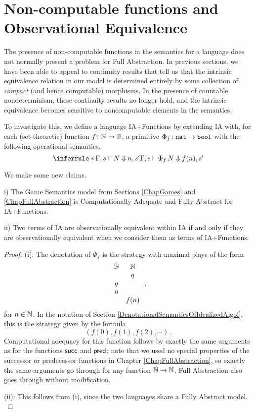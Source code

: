 \section{Non-computable functions and Observational Equivalence}
\label{SecNonComputable}

The presence of non-computable functions in the semantics for a language does not normally present a problem for Full Abstraction.  
In previous sections, we have been able to appeal to continuity results that tell us that the intrinsic equivalence relation in our model is determined entirely by some collection of \emph{compact} (and hence computable) morphisms.  
In the presence of countable nondeterminism, these continuity results no longer hold, and the intrinsic equivalence becomes sensitive to noncomputable elements in the semantics.

To investigate this, we define a language IA+Functions by extending IA with, for each (set-theoretic) function $f\colon \mathbb{N} \to \mathbb{B}$, a primitive $\Phi_f \colon {\mathtt{nat}} \to {\mathtt{bool}}$ with the following operational semantics.
\[
  \inferrule*{\Gamma,s\ts N \converges n,s'}{\Gamma,s \ts \mathop{\Phi_f}N \converges f(n),s'}
  \]

We make some new claims.

\begin{proposition}
  i) The Game Semantics model from Sections \ref{ChapGames} and \ref{ChapFullAbstraction} is Computationally Adequate and Fully Abstract for IA+Functions.

  ii) Two terms of IA are observationally equivalent within IA if and only if they are observationally equivalent when we consider them as terms of IA+Functions.
\end{proposition}
\begin{proof}
  (i): The denotation of $\Phi_f$ is the strategy with maximal plays of the form
  \[
    \begin{array}{cc}
      \mathbb{N} & \mathbb{N} \\
          &  q  \\
       q  &     \\
       n  &     \\
          & f(n)
    \end{array}\,,
    \]
  for $n\in \mathbb{N}$.  
  In the notation of Section \ref{DenotationalSemanticsOfIdealizedAlgol}, this is the strategy given by the formula
  \[
    ( f(0), f(1), f(2), \cdots )\,.
    \]
  Computational adequacy for this function follows by exactly the same arguments as for the functions $\operatorname{{\mathsf{succ}}}$ and $\operatorname{{\mathsf{pred}}}$; note that we used no special properties of the successor or predecessor functions in Chapter \ref{ChapFullAbstraction}, so exactly the same arguments go through for any function $\mathbb{N} \to \mathbb{N}$.  
  Full Abstraction also goes through without modification.

  (ii): This follows from (i), since the two languages share a Fully Abstract model.
  \label{PropPlusFunctions}
\end{proof}

